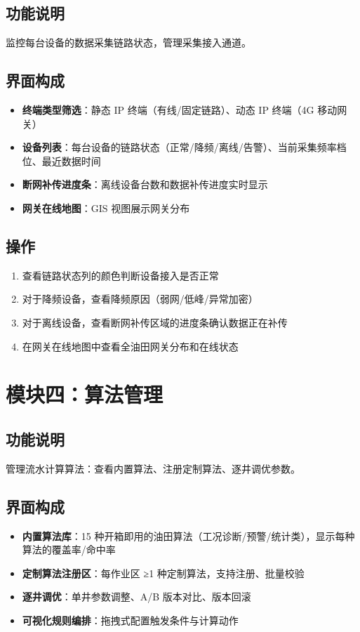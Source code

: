 \documentclass[11pt,a4paper]{ctexart}
\begin{document}
\subsection{功能说明}
监控每台设备的数据采集链路状态，管理采集接入通道。

\subsection{界面构成}
\begin{itemize}[leftmargin=*]
  \item \textbf{终端类型筛选}：静态 IP 终端（有线/固定链路）、动态 IP 终端（4G 移动网关）
  \item \textbf{设备列表}：每台设备的链路状态（正常/降频/离线/告警）、当前采集频率档位、最近数据时间
  \item \textbf{断网补传进度条}：离线设备台数和数据补传进度实时显示
  \item \textbf{网关在线地图}：GIS 视图展示网关分布
\end{itemize}

\subsection{操作}
\begin{enumerate}[leftmargin=*]
  \item 查看链路状态列的颜色判断设备接入是否正常
  \item 对于降频设备，查看降频原因（弱网/低峰/异常加密）
  \item 对于离线设备，查看断网补传区域的进度条确认数据正在补传
  \item 在网关在线地图中查看全油田网关分布和在线状态
\end{enumerate}

\section{模块四：算法管理}

\subsection{功能说明}
管理流水计算算法：查看内置算法、注册定制算法、逐井调优参数。

\subsection{界面构成}
\begin{itemize}[leftmargin=*]
  \item \textbf{内置算法库}：15 种开箱即用的油田算法（工况诊断/预警/统计类），显示每种算法的覆盖率/命中率
  \item \textbf{定制算法注册区}：每作业区 ≥1 种定制算法，支持注册、批量校验
  \item \textbf{逐井调优}：单井参数调整、A/B 版本对比、版本回滚
  \item \textbf{可视化规则编排}：拖拽式配置触发条件与计算动作
\end{itemize}
\end{document}
